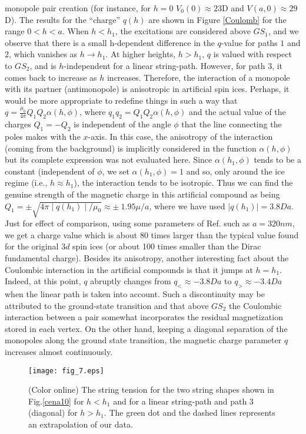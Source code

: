 \documentclass[aps,prb,twocolumn,floatfix,showpacs,amsmath,amssymb]{revtex4}
\begin{document}
monopole pair creation (for instance, for $h=0$ $V_0(0)\approx 23
$D and $V(a,0) \approx 29 $D). The results for the ``charge'' $q(h)$ are
shown in Figure \ref{Coulomb} for the range $0<h<a$. When $h<h_1$,
the excitations are considered above $GS_1$, and we observe that
there is a small h-dependent difference in the $q$-value for paths
$1$ and $2$, which vanishes as $h\to h_1$. At higher heights,
$h>h_1$, $q$ is valued with respect to $GS_2$, and is
$h$-independent for a linear string-path. However, for
path 3, it comes back to increase as $h$ increases. Therefore, the
interaction of a monopole with its partner (antimonopole) is
anisotropic in artificial spin ices. Perhaps, it would be more
appropriate to redefine things in such a way that
$q=\frac{\mu_0}{4\pi}Q_1Q_2 \alpha(h,\phi)$, where
$q_{1}q_{2}=Q_1Q_2 \alpha(h,\phi)$ and the actual value of the
charges $Q_{1}=-Q_{2}$ is independent of the angle $\phi$ that
the line connecting the poles makes with the $x$-axis. In this
case, the anisotropy of the interaction (coming from the
background) is implicitly considered in the function
$\alpha(h,\phi)$ but its complete expression was not evaluated
here. Since $\alpha(h_{1},\phi)$ tends to be a constant (independent of
$\phi$, we set $\alpha(h_{1},\phi)=1$ and so, only around the ice
regime (i.e., $h \approx h_{1}$), the interaction tends to be
isotropic. Thus we can find the genuine strength of the magnetic
charge in this artificial compound as being $ Q_1 = \pm \sqrt{4\pi
\mid q(h_{1}) \mid / \mu_{0}} \approx \pm\ 1.95 \mu/a $, where we
have used $ \mid q(h_{1}) \mid =3.8 Da $. Just for effect of
comparison, using some parameters of Ref. such
as $a=320nm$, we get a charge value which is about $80$ times
larger than the typical value found for the original $3d$ spin
ices \cite{Castelnovo08} (or about 100 times smaller than the
Dirac fundamental charge). Besides its anisotropy, another
interesting fact about the Coulombic interaction in the artificial
compounds is that it jumps at $h=h_{1}$. Indeed, at this point,
$q$ abruptly changes from $q_{<} \approx -3.8Da$ to $q_{>}\approx
-3.4Da$ when the linear path is taken into account. Such
a discontinuity may be attributed to the ground-state transition
and that above $GS_2$ the Coulombic interaction between a pair
somewhat incorporates the residual magnetization stored in each
vertex. On the other hand, keeping a diagonal separation
of the monopoles along the ground state transition, the magnetic
charge parameter $q$ increases almost continuously.

\begin{figure}
\texttt{[image: fig\_7.eps]}
\caption{\label{tension} (Color online) The string tension for the
two string shapes shown in Fig.\ref{cena10} for $h<h_1$ and for a
linear string-path and path 3 (diagonal) for $h>h_1$. The
green dot and the dashed lines represents an extrapolation of our
data.}
\end{figure}
\end{document}
